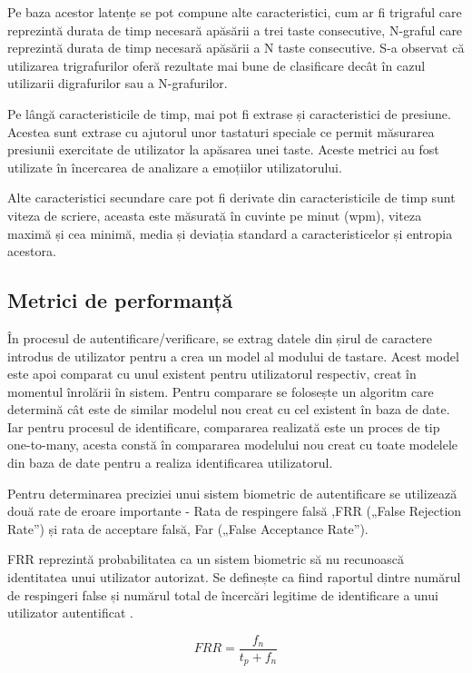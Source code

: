 \documentclass[9pt,shortpaper,twoside,web]{ieeecolor}
\begin{document}
	Pe baza acestor latențe se pot compune alte caracteristici, cum ar fi trigraful care reprezintă durata de timp necesară apăsării a trei taste consecutive, N-graful care reprezintă durata de timp necesară apăsării a N taste consecutive. S-a observat că utilizarea trigrafurilor oferă rezultate mai bune de clasificare decât în cazul utilizarii digrafurilor sau a N-grafurilor. 
		
	Pe lângă caracteristicile de timp, mai pot fi extrase și caracteristici de presiune. Acestea sunt extrase cu ajutorul unor tastaturi speciale ce permit măsurarea presiunii exercitate de utilizator la apăsarea unei taste. Aceste metrici au fost utilizate în încercarea de analizare a emoțiilor utilizatorului.

	Alte caracteristici secundare care pot fi derivate din caracteristicile de timp sunt viteza de scriere, aceasta este măsurată în cuvinte pe minut (wpm), viteza maximă și cea minimă, media și deviația standard a caracteristicelor și entropia acestora.
	

\subsection{Metrici de performanță}
	În procesul de autentificare/verificare, se extrag datele din șirul de caractere introdus de utilizator pentru a crea un model al modului de tastare. Acest model este apoi comparat cu unul existent pentru utilizatorul respectiv, creat în momentul înrolării în sistem. Pentru comparare se folosește un algoritm care determină cât este de similar modelul nou creat cu cel existent în baza de date. Iar pentru procesul de identificare, compararea realizată este un proces de tip one-to-many, acesta constă în compararea modelului nou creat cu toate modelele din baza de date pentru a realiza identificarea utilizatorul.
	
	Pentru determinarea preciziei unui sistem biometric de autentificare se utilizează două rate de eroare importante - Rata de respingere falsă ,FRR („False Rejection Rate”) și rata de acceptare falsă, Far („False Acceptance Rate”).


FRR reprezintă probabilitatea ca un sistem biometric să nu recunoască identitatea unui utilizator autorizat. Se definește ca fiind raportul dintre numărul de respingeri false și numărul total de încercări legitime de identificare a unui utilizator autentificat \cite{b7}.

\begin{equation} \label{eq2}
FRR = \frac{f_n}{t_p + f_n}
\end{equation}
\end{document}
